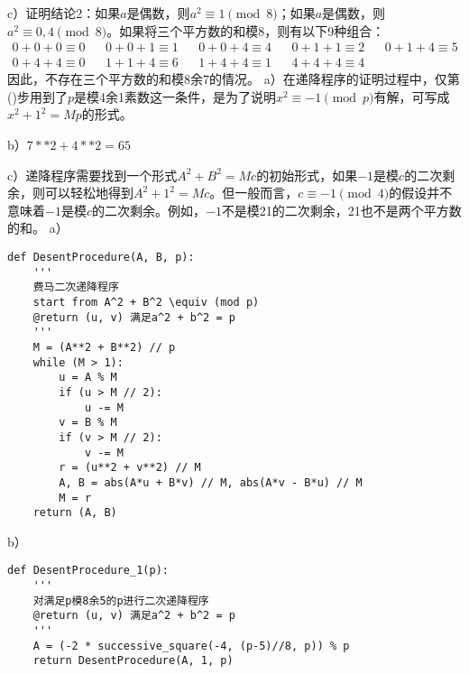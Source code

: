 c）证明结论2：如果$a$是偶数，则$a^2\equiv 1\pmod8$；如果$a$是偶数，则$a^2\equiv 0,4\pmod8$。如果将三个平方数的和模8，则有以下9种组合：
\begin{align*}
0+0+0\equiv0 && 0+0+1\equiv1 && 0+0+4\equiv4 && 0+1+1\equiv2 && 0+1+4\equiv5 \\
0+4+4\equiv0 && 1+1+4\equiv6 && 1+4+4\equiv1 && 4+4+4\equiv4 &&  
\end{align*}
因此，不存在三个平方数的和模8余7的情况。
%
\exercise a）在递降程序的证明过程中，仅第()步用到了$p$是模4余1素数这一条件，是为了说明$x^2\equiv-1\pmod p$有解，可写成$x^2+1^2=Mp$的形式。\par
b）$7**2 + 4**2 =65$\par
c）递降程序需要找到一个形式$A^2+B^2=Mc$的初始形式，如果$-1$是模$c$的二次剩余，则可以轻松地得到$A^2+1^2=Mc$。但一般而言，$c\equiv-1\pmod 4$的假设并不意味着$-1$是模$c$的二次剩余。例如，$-1$不是模21的二次剩余，21也不是两个平方数的和。
%
\exercise a）
\begin{lstlisting}
def DesentProcedure(A, B, p):
    ''' 
    费马二次递降程序
    start from A^2 + B^2 \equiv (mod p)
    @return (u, v) 满足a^2 + b^2 = p
    '''
    M = (A**2 + B**2) // p
    while (M > 1):
        u = A % M
        if (u > M // 2):
            u -= M
        v = B % M
        if (v > M // 2):
            v -= M
        r = (u**2 + v**2) // M
        A, B = abs(A*u + B*v) // M, abs(A*v - B*u) // M
        M = r
    return (A, B)
\end{lstlisting}
b）
\begin{lstlisting}
def DesentProcedure_1(p):
    ''' 
    对满足p模8余5的p进行二次递降程序
    @return (u, v) 满足a^2 + b^2 = p
    '''
    A = (-2 * successive_square(-4, (p-5)//8, p)) % p
    return DesentProcedure(A, 1, p)
\end{lstlisting}
